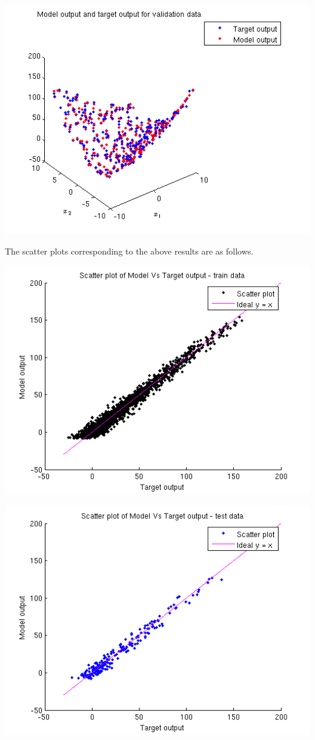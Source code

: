\documentclass{article}
\begin{document}
\begin{center}
\includegraphics[scale=.6]{Regression/bivar/nu/plot_val}
\end{center}
\newpage
The scatter plots corresponding to the above results are as follows.
\begin{center}
\includegraphics[scale=.6]{Regression/bivar/nu/scatter_train}
\end{center}
\begin{center}
\includegraphics[scale=.6]{Regression/bivar/nu/scatter_test}
\end{center}
\end{document}
